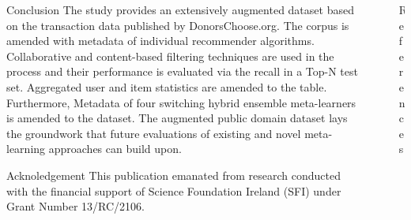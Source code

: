 \documentclass[final]{beamer}
\begin{document}
\begin{frame}[t,fragile=singleslide]{}
	\begin{columns}[t]
		\begin{column}{0.45\textwidth}
			\begin{block}{Conclusion}
				The study provides an extensively augmented dataset based on the transaction data published by DonorsChoose.org. The corpus is amended with metadata of individual recommender algorithms. Collaborative and content-based filtering techniques are used in the process and their performance is evaluated via the recall in a Top-N test set. Aggregated user and item statistics are amended to the table. Furthermore, Metadata of four switching hybrid ensemble meta-learners is amended to the dataset. The augmented public domain dataset lays the groundwork that future evaluations of existing and novel meta-learning approaches can build upon.
			\end{block}

			\begin{block}{Acknoledgement}
				\footnotesize
				This publication emanated from research conducted with the financial support of Science Foundation Ireland (SFI) under Grant Number 13/RC/2106.
			\end{block}
		\end{column}

		{
			\color{gray}
			\hspace{-1em}
			\vrule{}
			\hspace{+1em}
		}

		\begin{column}{0.45\textwidth}
			\begin{block}{References}
				\printbibliography[heading=none]
			\end{block}
		\end{column}
	\end{columns}
\end{frame}
\end{document}
